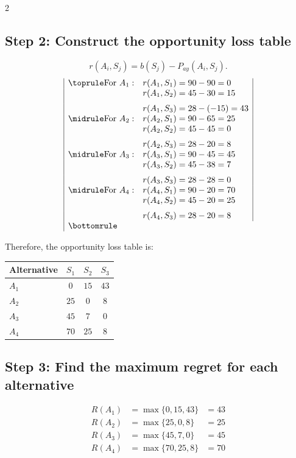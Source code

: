 \begin{multicols}{2}
		\subsection*{Step 2: Construct the opportunity loss table}
		\[
		r(A_i,S_j)
		=
		b(S_j)-P_{ay}(A_i,S_j).
		\]
	\[
	\begin{array}{|ll|}
		\toprule
		\text{For } A_1: &
		r(A_1,S_1) = 90-90=0
		\\
		&
		r(A_1,S_2) = 45-30=15
		\\[6pt]
		&
		r(A_1,S_3) = 28-(-15)=43
		\\
		\midrule
		\text{For } A_2: &
		r(A_2,S_1) = 90-65=25
		\\
		&
		r(A_2,S_2) = 45-45=0
		\\[6pt]
		&
		r(A_2,S_3) = 28-20=8
		\\
		\midrule
		\text{For } A_3: &
		r(A_3,S_1) = 90-45=45
		\\
		&
		r(A_3,S_2) = 45-38=7
		\\[6pt]
		&
		r(A_3,S_3) = 28-28=0
		\\
		\midrule
		\text{For } A_4: &
		r(A_4,S_1) = 90-20=70
		\\
		&
		r(A_4,S_2) = 45-20=25
		\\[6pt]
		&
		r(A_4,S_3) = 28-20=8
		\\
		\bottomrule
	\end{array}
	\]
		
		Therefore, the opportunity loss table is:\vspace{-3mm}
		\begin{center}
			\renewcommand{\arraystretch}{1.5}
			\small
			\begin{tabular}{lccc}
				\toprule
				Alternative & $S_1$ & $S_2$ & $S_3$ \\
				\midrule
				$A_1$ & $0$ & $15$ & $43$ \\
				$A_2$ & $25$ & $0$ & $8$ \\
				$A_3$ & $45$ & $7$ & $0$ \\
				$A_4$ & $70$ & $25$ & $8$ \\
				\bottomrule
			\end{tabular}
		\end{center}
		
		\subsection*{Step 3: Find the maximum regret for each alternative}\vspace{-3mm}
		\[
		\begin{array}{lll}
			R(A_1) &= \max\{0,15,43\} &= 43 \\[6pt]
			R(A_2) &= \max\{25,0,8\} &= 25 \\[6pt]
			R(A_3) &= \max\{45,7,0\} &= 45 \\[6pt]
			R(A_4) &= \max\{70,25,8\} &= 70
		\end{array}
		\]
		

\end{multicols}
